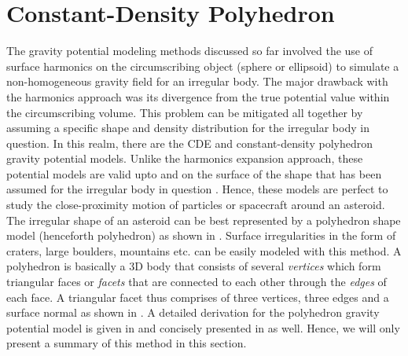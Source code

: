 \section{Constant-Density Polyhedron}
\label{subsec:polyhedron}
The gravity potential modeling methods discussed so far involved the use of surface harmonics on the circumscribing object (sphere or ellipsoid) to simulate a non-homogeneous gravity field for an irregular body. The major drawback with the harmonics approach was its divergence from the true potential value within the circumscribing volume. This problem can be mitigated all together by assuming a specific shape and density distribution for the irregular body in question. In this realm, there are the \gls{CDE} and constant-density polyhedron gravity potential models. Unlike the harmonics expansion approach, these potential models are valid upto and on the surface of the shape that has been assumed for the irregular body in question \parencite{scheeresBook}. Hence, these models are perfect to study the close-proximity motion of particles or spacecraft around an asteroid.
%
\newline\newline
%
The irregular shape of an asteroid can be best represented by a polyhedron shape model (henceforth polyhedron) as shown in . Surface irregularities in the form of craters, large boulders, mountains etc. can be easily modeled with this method. A polyhedron is basically a 3D body that consists of several \textit{vertices} which form triangular faces or \textit{facets} that are connected to each other through the \textit{edges} of each face. A triangular facet thus comprises of three vertices, three edges and a surface normal as shown in  \parencite{scheeresBook}. A detailed derivation for the polyhedron gravity potential model is given in \cite{scheeres_polyhedra} and concisely presented in \cite{scheeresBook} as well. Hence, we will only present a summary of this method in this section.
